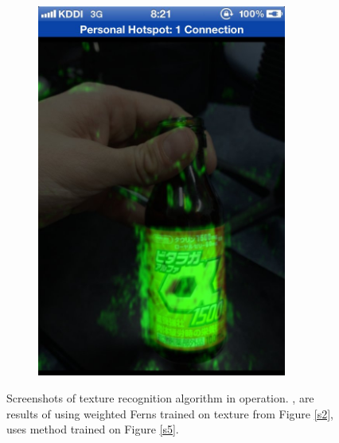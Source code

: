 \begin{figure}[ht]
\begin{subfigure}[b]{.3\linewidth}
	   \includegraphics[width=0.9\textwidth]{images/IMG_1812.jpg}
\caption{}
\label{scre3}
	 \end{subfigure}
 

    \caption{Screenshots of texture recognition algorithm in operation. \protect {} , \protect{} are results of using weighted Ferns trained on texture from Figure \protect \ref{s2}, \protect {} uses method trained on  Figure \protect \ref{s5}. }
    \label{screenshots}
\end{figure}
